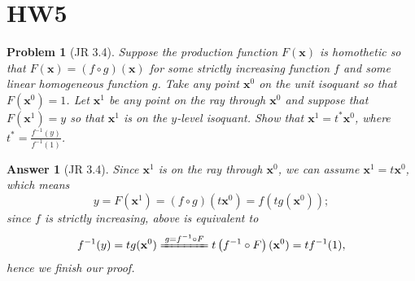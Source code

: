 \documentclass{article}
\newtheorem*{ans}{Answer}
\newtheorem*{prob}{{\bf Problem}}
\newcommand{\1}{{\bf 1}}
\newcommand{\0}{{\mathbf{0}}}
\newcommand{\x}{{\mathbf{x}}}
\newcommand{\<}{\langle}
\renewcommand{\>}{\rangle}
\begin{document}
\section{HW5}
\begin{prob}[JR 3.4] Suppose the production function $F(\x)$ is homothetic so that $F(\x ) = (f \circ g) (\x)$ for some strictly increasing function $f$ and some linear homogeneous function $g$. Take any point $\x^0$ on the unit isoquant so that $F \left(\x^0\right) = 1$. Let $\x^1$ be any point on the ray through $\x^0$ and suppose that $F(\x^1) = y$ so that $\x^1$ is on the $y$-level isoquant. Show that $\x^1 = t^*\x^0$, where $t^* = \frac{f^{-1}(y)}{f^{-1}(1)}$.
\end{prob}
\begin{ans}[JR 3.4] Since $\x^1$ is on the ray through $\x^0$, we can assume $\x^1 = t \x^0$, which means
	$$
	y = F\left( \x^1  \right) = \left( f \circ g\right) ( t \x^0) =  f \left(t g (  \x^0) \right);
	$$
	since $f$ is strictly increasing, above is equivalent to 
	$$	f^{-1}(y) = t g (  \x^0)  \xlongequal{g = f^{-1}\circ F} t \left(f^{-1} \circ F\right) (\x^0) = t f^{-1}(1),$$
hence we finish our proof.
\end{ans}
\end{document}
